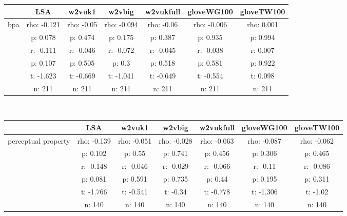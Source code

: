 \documentclass{article}
\begin{document}
\begin{tabular}{ccccccc|}\cline{2-7}
&\multicolumn{1}{|c}{LSA} & w2vuk1 & w2vbig & w2vukfull & gloveWG100 & gloveTW100 \\\hline
\multicolumn{1}{|c|}{\multirow{6}{*}{bpa}} & rho: -0.121 & rho: -0.05 & rho: -0.094 & rho: -0.06 & rho: -0.006 & rho: 0.001 \\
\multicolumn{1}{|c|}{} & p: 0.078 & p: 0.474 & p: 0.175 & p: 0.387 & p: 0.935 & p: 0.994 \\
\multicolumn{1}{|c|}{} & r: -0.111 & r: -0.046 & r: -0.072 & r: -0.045 & r: -0.038 & r: 0.007 \\
\multicolumn{1}{|c|}{} & p: 0.107 & p: 0.505 & p: 0.3 & p: 0.518 & p: 0.581 & p: 0.922 \\
\multicolumn{1}{|c|}{} & t: -1.623 & t: -0.669 & t: -1.041 & t: -0.649 & t: -0.554 & t: 0.098 \\
\multicolumn{1}{|c|}{} & n: 211 & n: 211 & n: 211 & n: 211 & n: 211 & n: 211 \\
\hline
\end{tabular}\\
\begin{tabular}{ccccccc|}\cline{2-7}
&\multicolumn{1}{|c}{LSA} & w2vuk1 & w2vbig & w2vukfull & gloveWG100 & gloveTW100 \\\hline
\multicolumn{1}{|c|}{\multirow{6}{*}{perceptual property}} & rho: -0.139 & rho: -0.051 & rho: -0.028 & rho: -0.063 & rho: -0.087 & rho: -0.062 \\
\multicolumn{1}{|c|}{} & p: 0.102 & p: 0.55 & p: 0.741 & p: 0.456 & p: 0.306 & p: 0.465 \\
\multicolumn{1}{|c|}{} & r: -0.148 & r: -0.046 & r: -0.029 & r: -0.066 & r: -0.11 & r: -0.086 \\
\multicolumn{1}{|c|}{} & p: 0.081 & p: 0.591 & p: 0.735 & p: 0.44 & p: 0.195 & p: 0.311 \\
\multicolumn{1}{|c|}{} & t: -1.766 & t: -0.541 & t: -0.34 & t: -0.778 & t: -1.306 & t: -1.02 \\
\multicolumn{1}{|c|}{} & n: 140 & n: 140 & n: 140 & n: 140 & n: 140 & n: 140 \\
\hline
\end{tabular}\\
\end{document}
